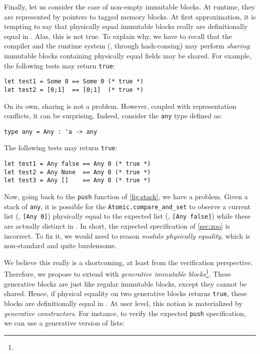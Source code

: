 Finally, let us consider the case of non-empty immutable blocks.
At runtime, they are represented by pointers to tagged memory blocks.
At first approximation, it is tempting to say that physically equal immutable blocks really are definitionally equal in \Rocq.
Alas, this is not true.
To explain why, we have to recall that the \OCaml compiler and the runtime system (\eg, through hash-consing) may perform \emph{sharing}: immutable blocks containing physically equal fields may be shared.
For example, the following tests may return \texttt{true}:

\begin{verbatim}
let test1 = Some 0 == Some 0 (* true *)
let test2 = [0;1]  == [0;1]  (* true *)
\end{verbatim}

On its own, sharing is not a problem.
However, coupled with representation conflicts, it can be surprising.
Indeed, consider the \texttt{any} type defined as:

\begin{verbatim}
type any = Any : 'a -> any
\end{verbatim}

The following tests may return \texttt{true}:

\begin{verbatim}
let test1 = Any false == Any 0 (* true *)
let test2 = Any None  == Any 0 (* true *)
let test3 = Any []    == Any 0 (* true *)
\end{verbatim}

Now, going back to the \texttt{push} function of \cref{fig:stack}, we have a problem.
Given a stack of \texttt{any}, it is possible for the \texttt{Atomic.compare_and_set} to observe a current list (\eg, \texttt{[Any 0]}) physically equal to the expected list (\eg, \texttt{[Any false]}) while these are actually distinct in \Rocq.
In short, the expected specification of \cref{sec:zoo} is incorrect.
To fix it, we would need to reason \emph{modulo physically equality}, which is non-standard and quite burdensome.

We believe this really is a shortcoming, at least from the verification perspective.
Therefore, we propose to extend \OCaml with \emph{generative immutable blocks}\footnote{}.
These generative blocks are just like regular immutable blocks, except they cannot be shared.
Hence, if physical equality on two generative blocks returns \texttt{true}, these blocks are definitionally equal in \Rocq.
At user level, this notion is materialized by \emph{generative constructors}.
For instance, to verify the expected \texttt{push} specification, we can use a generative version of lists:

